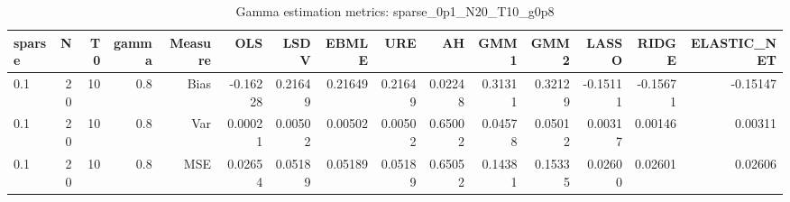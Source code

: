 \begin{table}[!htbp]\centering
\caption{Gamma estimation metrics: sparse_0p1_N20_T10_g0p8}
\label{tab:table1_sparse_0p1_N20_T10_g0p8}
\begin{tabular}{lrrrrrrrrrrrrrr}
\hline
sparse & N & T0 & gamma & Measure & OLS & LSDV & EBMLE & URE & AH & GMM1 & GMM2 & LASSO & RIDGE & ELASTIC_NET \\
\hline
0.1 & 20 & 10 & 0.8 & Bias & -0.16228 & 0.21649 & 0.21649 & 0.21649 & 0.02248 & 0.31311 & 0.32129 & -0.15111 & -0.15671 & -0.15147 \\
0.1 & 20 & 10 & 0.8 & Var & 0.00021 & 0.00502 & 0.00502 & 0.00502 & 0.65002 & 0.04578 & 0.05012 & 0.00317 & 0.00146 & 0.00311 \\
0.1 & 20 & 10 & 0.8 & MSE & 0.02654 & 0.05189 & 0.05189 & 0.05189 & 0.65052 & 0.14381 & 0.15335 & 0.02600 & 0.02601 & 0.02606 \\
\hline
\end{tabular}
\end{table}

